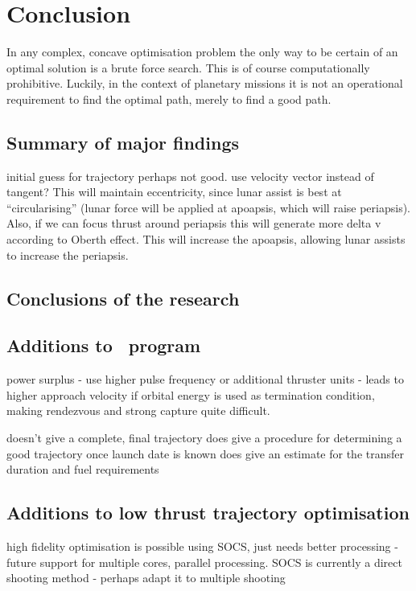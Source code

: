 \chapter{Conclusion} \label{cha:Conclusion}

In any complex, concave optimisation problem the only way to be certain of an optimal solution is a brute force search. This is of course computationally prohibitive. Luckily, in the context of planetary missions it is not an operational requirement to find the optimal path, merely to find a good path. 


\section{Summary of major findings}
initial guess for trajectory perhaps not good. use velocity vector instead of tangent? This will maintain eccentricity, since lunar assist is best at \enquote{circularising} (lunar force will be applied at apoapsis, which will raise periapsis).
Also, if we can focus thrust around periapsis this will generate more delta v according to Oberth effect. This will increase the apoapsis, allowing lunar assists to increase the periapsis.

\section{Conclusions of the research}

\section{Additions to \BW\ program} \label{sec:BW1-additions}
power surplus - use higher pulse frequency or additional thruster units - leads to higher approach velocity if orbital energy is used as termination condition, making rendezvous and strong capture quite difficult.

doesn't give a complete, final trajectory
does give a procedure for determining a good trajectory once launch date is known
does give an estimate for the transfer duration and fuel requirements

\section{Additions to low thrust trajectory optimisation} \label{sec:Optimisation-additions}

high fidelity optimisation is possible using SOCS, just needs better processing - future support for multiple cores, parallel processing. SOCS is currently a direct shooting method - perhaps adapt it to multiple shooting

